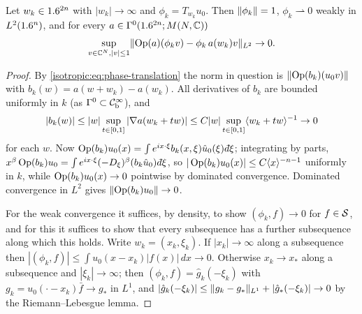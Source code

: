 \begin{lemma}\label{isotropic:lem:coherent}
Let $w_k\in1.6^{2n}$ with $|w_k|\to\infty$ and $\phi_k=T_{w_k}u_0$. Then
$\lVert \phi_k\rVert=1$, $\phi_k\rightharpoonup0$ weakly in $L^2(1.6^n)$, and for every
$a\in\Gamma^{0}(1.6^{2n};M(N,\mathbb{C}))$
\begin{equation*}
  \sup_{v\in\mathbb{C}^N,|v|\le1}\lVert \operatorname{Op}(a)(\phi_kv)-\phi_k\,a(w_k)v\rVert_{L^2}\to0 .
\end{equation*}
\end{lemma}
\begin{proof}
By \eqref{isotropic:eq:phase-translation} the norm in question is
$\lVert \operatorname{Op}(b_k)(u_0v)\rVert$ with $b_k(w)=a(w+w_k)-a(w_k)$. All derivatives of $b_k$
are bounded uniformly in $k$ (as $\Gamma^{0}\subset\mathcal{C}^\infty_{\mathrm{b}}$), and
\begin{equation*}
  |b_k(w)|\le|w|\sup_{t\in[0,1]}|\nabla a(w_k+tw)|\le C|w|\sup_{t\in[0,1]}\langle w_k+tw\rangle^{-1}\to0
\end{equation*}
for each $w$. Now $\Op(b_k)u_0(x)=\int e^{ix\cdot\xi}b_k(x,\xi)\hat u_0(\xi)\,\dbar\xi$;
integrating by parts,
$x^\beta\Op(b_k)u_0=\int e^{ix\cdot\xi}(-D_\xi)^\beta(b_k\hat u_0)\,\dbar\xi$, so
$|\operatorname{Op}(b_k)u_0(x)|\le C\langle x\rangle^{-n-1}$ uniformly in $k$, while
$\operatorname{Op}(b_k)u_0(x)\to0$ pointwise by dominated convergence. Dominated
convergence in $L^2$ gives $\lVert \operatorname{Op}(b_k)u_0\rVert\to0$.

For the weak convergence it suffices, by density, to show
$(\phi_k,f)\to0$ for $f\in\mathcal{S}$, and for this it suffices to show that every
subsequence has a further subsequence along which this holds. Write
$w_k=(x_k,\xi_k)$. If $|x_k|\to\infty$ along a subsequence then
$|(\phi_k,f)|\le\int u_0(x-x_k)|f(x)|\,dx\to0$. Otherwise $x_k\to x_*$ along a
subsequence and $|\xi_k|\to\infty$; then $(\phi_k,f)=\hat g_k(-\xi_k)$ with
$g_k=u_0(\cdot-x_k)\bar f\to g_*$ in $L^1$, and
$|\hat g_k(-\xi_k)|\le\lVert g_k-g_*\rVert_{L^1}+|\hat g_*(-\xi_k)|\to0$ by the
Riemann--Lebesgue lemma.
\end{proof}

